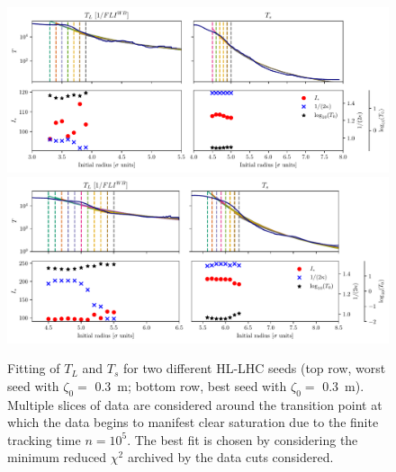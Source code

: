 \begin{figure}
    \centering
    \includegraphics[width=1\textwidth]{6_lhc_dynamic_indicators/figs/fit_l_time_bad.pdf}
    \includegraphics[width=1\textwidth]{6_lhc_dynamic_indicators/figs/fit_l_time_best.pdf}
    \caption{Fitting of $T_L$ and $T_s$ for two different HL-LHC seeds (top row, worst seed with $\zeta_0=$ \SI{0.3}{\meter}; bottom row, best seed with $\zeta_0=$ \SI{0.3}{\meter}). Multiple slices of data are considered around the transition point at which the data begins to manifest clear saturation due to the finite tracking time $n=10^5$. The best fit is chosen by considering the minimum reduced $\chi^2$ archived by the data cuts considered.}
    \label{fig:the_lyap_fit}
\end{figure}

